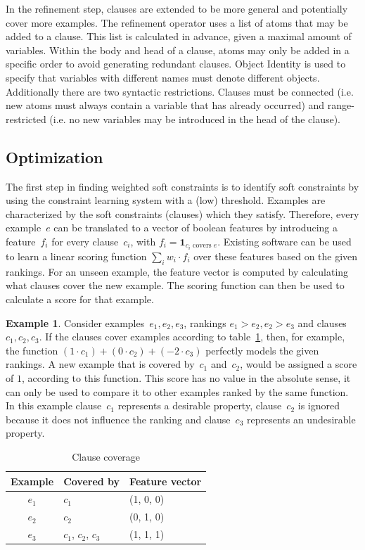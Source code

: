 \documentclass[letterpaper]{article}
\theoremstyle{definition}
\newtheorem{example}{Example}
\begin{document}
In the refinement step, clauses are extended to be more general and potentially cover more examples.
The refinement operator uses a list of atoms that may be added to a clause.
This list is calculated in advance, given a maximal amount of variables.
Within the body and head of a clause, atoms may only be added in a specific order to avoid generating redundant clauses.
Object Identity is used to specify that variables with different names must denote different objects.
Additionally there are two syntactic restrictions.
Clauses must be connected (i.e. new atoms must always contain a variable that has already occurred) and range-restricted (i.e. no new variables may be introduced in the head of the clause).

\subsection{Optimization}
The first step in finding weighted soft constraints is to identify soft constraints by using the constraint learning system with a (low) threshold.
Examples are characterized by the soft constraints (clauses) which they satisfy.
Therefore, every example~$e$ can be translated to a vector of boolean features by introducing a feature~$f_i$ for every clause~$c_i$, with $f_i = \mathbf{1}_{c_i \text{ covers } e}$.
Existing software can be used to learn a linear scoring function $\sum_i w_i \cdot f_i$ over these features based on the given rankings.
For an unseen example, the feature vector is computed by calculating what clauses cover the new example.
The scoring function can then be used to calculate a score for that example.

\begin{example}
  Consider examples~$e_1, e_2, e_3$, rankings $e_1 > e_2, e_2 > e_3$ and clauses $c_1, c_2, c_3$.
  If the clauses cover examples according to table~\ref{tbl:cover_examples}, then, for example, the function $(1 \cdot c_1) + (0\cdot c_2) + (-2\cdot c_3)$ perfectly models the given rankings.
  A new example that is covered by~$c_1$ and~$c_2$, would be assigned a score of $1$, according to this function.
  This score has no value in the absolute sense, it can only be used to compare it to other examples ranked by the same function.
  In this example clause~$c_1$ represents a desirable property, clause~$c_2$ is ignored because it does not influence the ranking and clause~$c_3$ represents an undesirable property.

  \begin{table}
  \caption{Clause coverage}
  \label{tbl:cover_examples}
  \begin{tabularx}{\linewidth}{c|l|X}
    \textbf{Example} & \textbf{Covered by} & \textbf{Feature vector}\\
    \toprule
    $e_1$             & $c_1$               & (1, 0, 0) \\
    $e_2$             & $c_2$               & (0, 1, 0) \\
    $e_3$             & $c_1$, $c_2$, $c_3$ & (1, 1, 1) \\
  \end{tabularx}
  \end{table}
\end{example}
\end{document}
